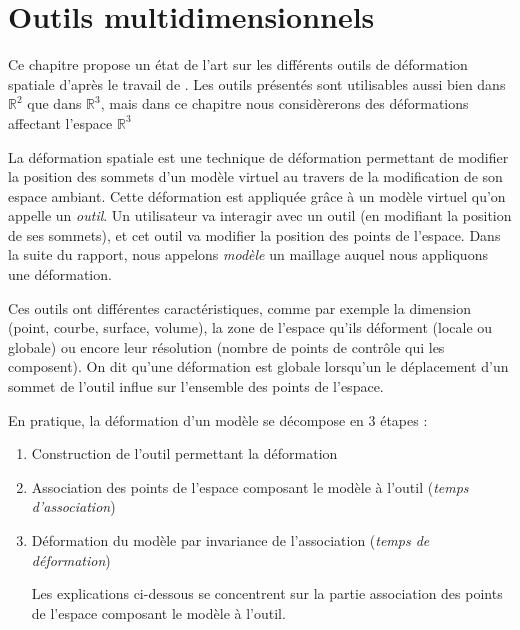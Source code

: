 

\chapter{Outils multidimensionnels}

\graphicspath{{Chapter1/Chapter1Figs/PNG/}{Chapter1/Chapter1Figs/PDF/}{Chapter1/Chapter1Figs/}}

Ce chapitre propose un état de l'art sur les différents outils de déformation
spatiale d'après le travail de \cite{GB08}. Les outils présentés sont
utilisables aussi bien dans $\mathbb{R}^2$ que dans $\mathbb{R}^3$, mais dans
ce chapitre nous considèrerons des déformations affectant l'espace
$\mathbb{R}^3$

La déformation spatiale est une technique de déformation permettant de
modifier la position des sommets d'un modèle virtuel au travers de la
modification de son espace ambiant. Cette déformation est appliquée grâce à un
modèle virtuel qu'on appelle un \textit{outil}. Un utilisateur va interagir
avec un outil (en modifiant la position de ses sommets), et cet outil va
modifier la position des points de l'espace. Dans la suite du rapport, nous
appelons \textit{modèle} un maillage auquel nous appliquons une déformation.

Ces outils ont différentes caractéristiques, comme par exemple la
dimension (point, courbe, surface, volume), la zone de l'espace qu'ils
déforment (locale ou globale) ou encore leur résolution (nombre
de points de contrôle qui les composent). On dit qu'une déformation est
globale lorsqu'un le déplacement d'un sommet de l'outil influe sur l'ensemble
des points de l'espace.

En pratique, la déformation d'un modèle se décompose en 3 étapes :
\begin{enumerate}

\item Construction de l'outil permettant la déformation

\item Association des points de l'espace composant le modèle à l'outil
(\textit{temps d'association})

\item Déformation du modèle par invariance de l'association (\textit{temps de
déformation})

Les explications ci-dessous se concentrent sur la partie association des
points de l'espace composant le modèle à l'outil.

\end{enumerate} 


